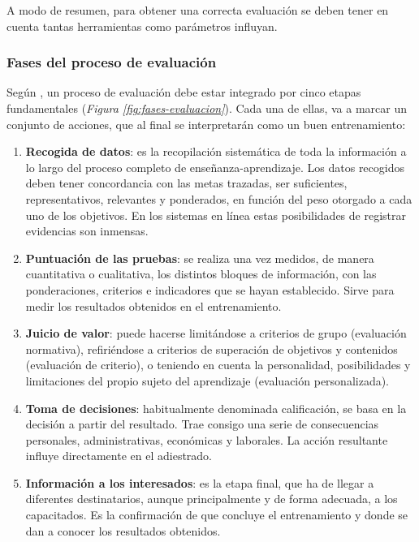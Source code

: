 A modo de resumen, para obtener una correcta evaluación se deben tener en cuenta tantas herramientas como parámetros influyan.

\subsubsection{Fases del proceso de evaluación}
Según \cite{Aretio2020}, un proceso de evaluación debe estar integrado por cinco etapas fundamentales (\textsl{Figura \ref{fig:fases-evaluacion}}). Cada una de ellas, va a marcar un conjunto de acciones, que al final se interpretarán como un buen entrenamiento:

\begin{enumerate}
\item \textbf{Recogida de datos}: es la recopilación sistemática de toda la información a lo largo del proceso completo de enseñanza-aprendizaje. Los datos recogidos deben tener concordancia con las metas trazadas, ser suficientes, representativos, relevantes y ponderados, en función del peso otorgado a cada uno de los objetivos. En los sistemas en línea estas posibilidades de registrar evidencias son inmensas.
\item \textbf{Puntuación de las pruebas}: se realiza una vez medidos, de manera cuantitativa o cualitativa, los distintos bloques de información, con las ponderaciones, criterios e indicadores que se hayan establecido. Sirve para medir los resultados obtenidos en el entrenamiento.
\item \textbf{Juicio de valor}: puede hacerse limitándose a criterios de grupo (evaluación normativa), refiriéndose a criterios de superación de objetivos y contenidos (evaluación de criterio), o teniendo en cuenta la personalidad, posibilidades y limitaciones del propio sujeto del aprendizaje (evaluación personalizada).
\item \textbf{Toma de decisiones}: habitualmente denominada calificación, se basa en la decisión a partir del resultado. Trae consigo una serie de consecuencias personales, administrativas, económicas y laborales. La acción resultante influye directamente en el adiestrado.
\item \textbf{Información a los interesados}: es la etapa final, que ha de llegar a diferentes destinatarios, aunque principalmente y de forma adecuada, a los capacitados. Es la confirmación de que concluye el entrenamiento y donde se dan a conocer los resultados obtenidos.
\end{enumerate}


